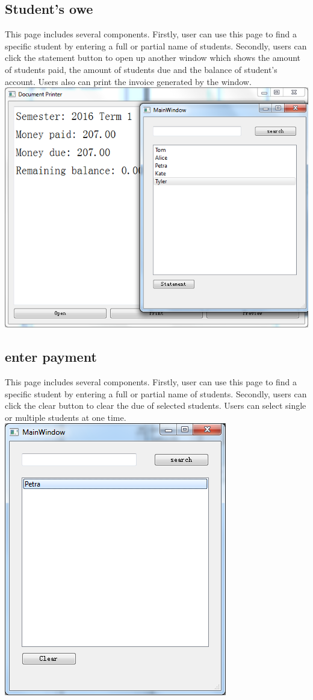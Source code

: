 \subsection{Student's owe}
This page includes several components. Firstly, user can use this page to find a specific student by entering a full or partial name of students. Secondly, users can click the statement button to open up another window which shows the amount of students paid, the amount of students due and the balance of student's account. Users also can print the invoice generated by the window.\\
\includegraphics[scale=0.5]{invoice.png}

\subsection{enter payment}
This page includes several components. Firstly, user can use this page to find a specific student by entering a full or partial name of students. Secondly, users can click the clear button to clear the due of selected students. Users can select single or multiple students at one time.\\
\includegraphics[scale=0.5]{enterPayment.png}

